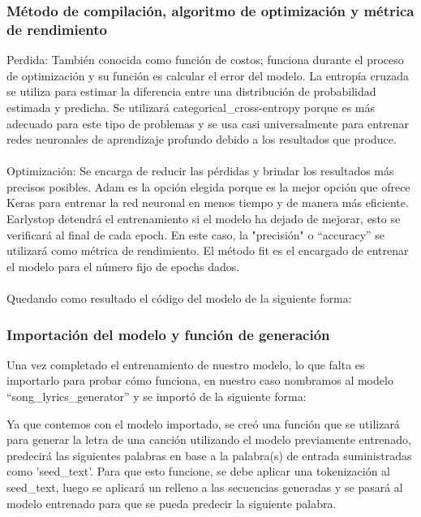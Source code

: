 \subsubsection{Método de compilación, algoritmo de optimización y métrica de rendimiento}
Perdida: También conocida como función de costos; funciona durante el proceso de optimización y su función es calcular el error del modelo. La entropía cruzada se utiliza para estimar la diferencia entre una distribución de probabilidad estimada y predicha. Se utilizará categorical\_cross-entropy porque es más adecuado para este tipo de problemas y se usa casi universalmente para entrenar redes neuronales de aprendizaje profundo debido a los resultados que produce.\\\\
Optimización: Se encarga de reducir las pérdidas y brindar los resultados más precisos posibles. Adam es la opción elegida porque es la mejor opción que ofrece Keras para entrenar la red neuronal en menos tiempo y de manera más eficiente. Earlystop detendrá el entrenamiento si el modelo ha dejado de mejorar, esto se verificará al final de cada epoch. En este caso, la "precisión" o “accuracy” se utilizará como métrica de rendimiento.
El método fit es el encargado de entrenar el modelo para el número fijo de epochs dados.\\\\
Quedando como resultado el código del modelo de la siguiente forma:

\begin{center}
	
\end{center}
\subsubsection{Importación del modelo y función de generación}
Una vez completado el entrenamiento de nuestro modelo, lo que falta es importarlo para probar cómo funciona, en nuestro caso nombramos al modelo “song\_lyrics\_generator” y se importó de la siguiente forma:

\begin{center}
	
\end{center}
Ya que contemos con el modelo importado, se creó una función que se utilizará para generar la letra de una canción utilizando el modelo previamente entrenado, predecirá las siguientes palabras en base a la palabra(s) de entrada suministradas como 'seed\_text'. Para que esto funcione, se debe aplicar una tokenización al seed\_text, luego se aplicará un relleno a las secuencias generadas y se pasará al modelo entrenado para que se pueda predecir la siguiente palabra.

\begin{center}
	
\end{center}
